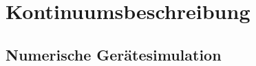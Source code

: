 \section{Kontinuumsbeschreibung}
\label{kontinuumsbeschreibung}

\subsection{Numerische Gerätesimulation}
\label{cha:numerischegeraetesimulation}
